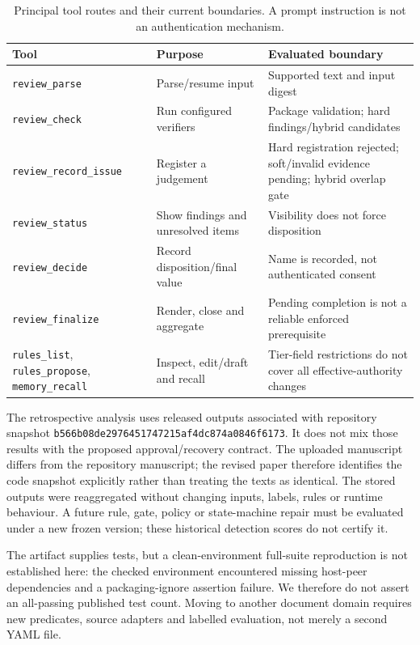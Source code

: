 \begin{table}[!ht]
\caption{Principal tool routes and their current boundaries. A prompt instruction is not an authentication mechanism.}
\label{tab:tools}
\centering\footnotesize
\begin{tabularx}{\textwidth}{@{}p{3.4cm}XX@{}}
\toprule
Tool & Purpose & Evaluated boundary \\
\midrule
\texttt{review\_parse} & Parse/resume input & Supported text and input digest \\
\texttt{review\_check} & Run configured verifiers & Package validation; hard findings/hybrid candidates \\
\texttt{review\_record\_issue} & Register a judgement & Hard registration rejected; soft/invalid evidence pending; hybrid overlap gate \\
\texttt{review\_status} & Show findings and unresolved items & Visibility does not force disposition \\
\texttt{review\_decide} & Record disposition/final value & Name is recorded, not authenticated consent \\
\texttt{review\_finalize} & Render, close and aggregate & Pending completion is not a reliable enforced prerequisite \\
\texttt{rules\_list}, \texttt{rules\_propose}, \texttt{memory\_recall} & Inspect, edit/draft and recall & Tier-field restrictions do not cover all effective-authority changes \\
\bottomrule
\end{tabularx}
\end{table}

The retrospective analysis uses released outputs associated with repository snapshot \texttt{b566b08de2976451747215af4dc874a0846f6173}. It does not mix those results with the proposed approval/recovery contract. The uploaded manuscript differs from the repository manuscript; the revised paper therefore identifies the code snapshot explicitly rather than treating the texts as identical. The stored outputs were reaggregated without changing inputs, labels, rules or runtime behaviour. A future rule, gate, policy or state-machine repair must be evaluated under a new frozen version; these historical detection scores do not certify it.

The artifact supplies tests, but a clean-environment full-suite reproduction is not established here: the checked environment encountered missing host-peer dependencies and a packaging-ignore assertion failure. We therefore do not assert an all-passing published test count. Moving to another document domain requires new predicates, source adapters and labelled evaluation, not merely a second YAML file.

